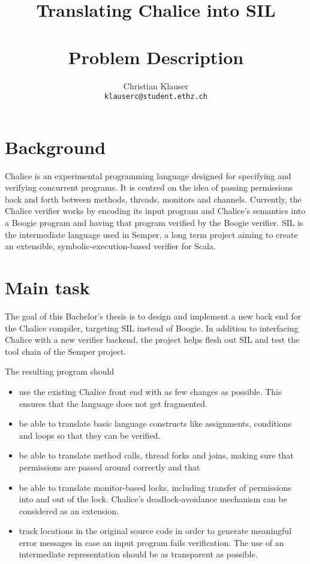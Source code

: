 \documentclass[11pt]{article} %
\title{{\Huge Translating Chalice into SIL}\\{\small\ }\\{\huge Problem Description}}
\author{Christian Klauser\\ \texttt{klauserc@student.ethz.ch}}
\begin{document}
\maketitle

\section{Background}
Chalice is an experimental programming language designed for specifying and verifying concurrent programs. It is centred on the idea of passing permissions back and forth between methods, threads, monitors and channels. Currently, the Chalice verifier works by encoding its input program and Chalice's semantics into a Boogie program and having that program verified by the Boogie verifier. 
SIL is the intermediate language used in Semper, a long term project aiming to create an extensible, symbolic-execution-based verifier for Scala.

\section{Main task}
The goal of this Bachelor's thesis is to design and implement a new back end for the Chalice compiler, targeting SIL instead of Boogie. In addition to interfacing Chalice with a new verifier backend, the project helps flesh out SIL and test the tool chain of the Semper project.

The resulting program should
\begin{itemize}
\item use the existing Chalice front end with as few changes as possible. This ensures that the language does not get fragmented.
\item be able to translate basic language constructs like assignments, conditions and loops so that they can be verified.
\item be able to translate method calls, thread forks and joins, making sure that permissions are passed around correctly and that 
\item be able to translate monitor-based locks, including transfer of permissions into and out of the lock. Chalice's deadlock-avoidance mechanism can be considered as an extension.
\item track locations in the original source code in order to generate meaningful error messages in case an input program fails verification. The use of an intermediate representation should be as transparent as possible.
\end{itemize}
\end{document}
